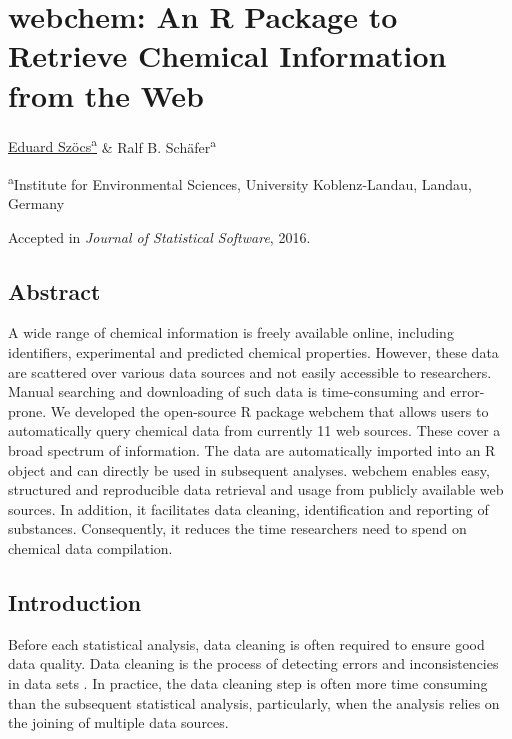 \chapter[webchem: An R Package to Retrieve Chemical Information]{webchem: An R Package to Retrieve Chemical Information from the Web}
\label{sec:webchem}  

\begin{sloppypar}
\bigskip
\underline{Eduard Szöcs\textsuperscript{a}} \& Ralf B. Schäfer\textsuperscript{a}

\bigskip
\small
\noindent 
\textsuperscript{a}Institute for Environmental Sciences, University Koblenz-Landau, Landau, Germany 

\bigskip 
\normalsize
\noindent
Accepted in \emph{Journal of Statistical Software}, 2016.

\end{sloppypar}
\newpage


\section{Abstract}
A wide range of chemical information is freely available online, including identifiers, experimental and predicted chemical properties.
However, these data are scattered over various data sources and not easily accessible to researchers.
Manual searching and downloading of such data is time-consuming and error-prone.  
We developed the open-source R package webchem that allows users to automatically query chemical data from currently 11 web sources. 
These cover a broad spectrum of information.
The data are automatically imported into an R object and can directly be used in subsequent analyses.
webchem enables easy, structured and reproducible data retrieval and usage from publicly available web sources.
In addition, it facilitates data cleaning, identification and reporting of substances.
Consequently, it reduces the time researchers need to spend on chemical data compilation.

\section[Introduction]{Introduction}
Before each statistical analysis, data cleaning is often required to ensure good data quality.
Data cleaning is the process of detecting errors and inconsistencies in data sets \citep{Chapman_2005}.
In practice, the data cleaning step is often more time consuming than the subsequent statistical analysis, particularly, when the analysis relies on the joining of multiple data sources.


